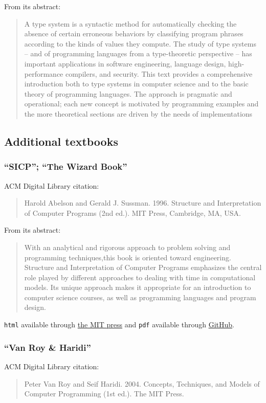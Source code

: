 \documentclass[11pt]{article}
\begin{document}
From its abstract:
\begin{quote}
A type system is a syntactic method for automatically checking the
absence of certain erroneous behaviors by classifying program phrases
according to the kinds of values they compute. The study of type systems
– and of programming languages from a type-theoretic perspective –
has important applications in software engineering, language design,
high-performance compilers, and security. This text provides a
comprehensive introduction both to type systems in computer science
and to the basic theory of programming languages. The approach is
pragmatic and operational; each new concept is motivated by programming
examples and the more theoretical sections are driven by the
needs of implementations
\end{quote}

\subsection{Additional textbooks}
\label{sec:orgf4ccd7d}
\subsubsection{\textbf{“SICP”}; “The Wizard Book”}
\label{sec:org9d6d83c}
ACM Digital Library citation:
\begin{quote}
Harold Abelson and Gerald J. Sussman. 1996.
Structure and Interpretation of Computer Programs (2nd ed.).
MIT Press, Cambridge, MA, USA.
\end{quote}

From its abstract:
\begin{quote}
With an analytical and rigorous approach to problem solving
and programming techniques,this book is oriented toward engineering.
Structure and Interpretation of Computer Programs emphasizes
the central role played by different approaches
to dealing with time in computational models.
Its unique approach makes it appropriate for
an introduction to computer science courses,
as well as programming languages and program design.
\end{quote}

\texttt{html} available through
\href{https://mitpress.mit.edu/sites/default/files/sicp/index.html}{the MIT press}
and \texttt{pdf} available through
\href{https://github.com/sarabander/sicp-pdf}{GitHub}.
\subsubsection{\textbf{“Van Roy \& Haridi”}}
\label{sec:org9f192da}
ACM Digital Library citation:
\begin{quote}
Peter Van Roy and Seif Haridi. 2004.
Concepts, Techniques, and Models of Computer Programming (1st ed.).
The MIT Press.
\end{quote}
\end{document}
